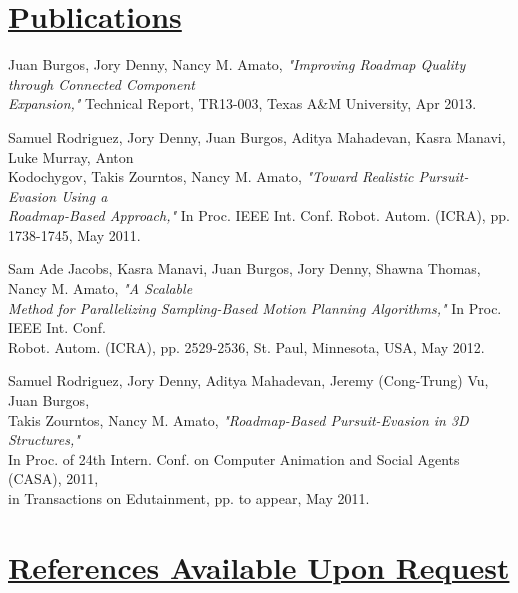 \documentclass[8pt]{res}
\begin{document}
\begin{resume}

    \section{\underline{Publications}}
    Juan Burgos, Jory Denny, Nancy M. Amato, \emph{"Improving Roadmap Quality through Connected Component \\
    Expansion,"} Technical Report, TR13-003, Texas A\&M University, Apr 2013.

    Samuel Rodriguez, Jory Denny, Juan Burgos, Aditya Mahadevan, Kasra Manavi, Luke Murray, Anton \\
    Kodochygov, Takis Zourntos, Nancy M. Amato, \emph{"Toward Realistic Pursuit-Evasion Using a \\
    Roadmap-Based Approach,"} In Proc. IEEE Int. Conf. Robot. Autom. (ICRA), pp. 1738-1745, May 2011. 

    Sam Ade Jacobs, Kasra Manavi, Juan Burgos, Jory Denny, Shawna Thomas, Nancy M. Amato, \emph{"A Scalable \\
    Method for Parallelizing Sampling-Based Motion Planning Algorithms,"} In Proc. IEEE Int. Conf. \\
    Robot. Autom. (ICRA), pp. 2529-2536, St. Paul, Minnesota, USA, May 2012. 

    Samuel Rodriguez, Jory Denny, Aditya Mahadevan, Jeremy (Cong-Trung) Vu, Juan Burgos, \\
    Takis Zourntos, Nancy M. Amato, \emph{"Roadmap-Based Pursuit-Evasion in 3D Structures,"} \\
    In Proc. of 24th Intern. Conf. on Computer Animation and Social Agents (CASA), 2011, \\
    in Transactions on Edutainment, pp. to appear, May 2011.


    \section{\underline{References Available Upon Request}}


  \end{resume}
\end{document}
